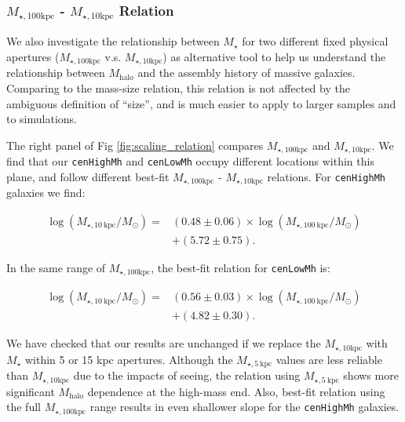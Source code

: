 \documentclass[a4paper,fleqn,usenatbib]{mnras}
\def\rbcg{\texttt{cenHighMh}}
\def\nbcg{\texttt{cenLowMh}}
\def\mstar{{$M_{\star}$}}
\def\mhalo{{$M_{\mathrm{halo}}$}}
\def\minn{{$M_{\star,10\mathrm{kpc}}$}}
\def\mtot{{$M_{\star,100\mathrm{kpc}}$}}
\begin{document}
\subsubsection{\mtot{} - \minn{} Relation}
    \label{sssec:m100_m10}
    
    We also investigate the relationship between \mstar{} for two different
    fixed physical apertures (\mtot{} v.s. \minn{}) as alternative tool to help us 
    understand the relationship between \mhalo{} and the assembly history of massive
    galaxies.   
    Comparing to the mass-size relation, this relation is not affected by the 
    ambiguous definition of ``size'', and is much easier to apply to larger samples 
    and to simulations. 
    
    The right panel of Fig \ref{fig:scaling_relation} compares \mtot{} and \minn{}. 
    We find that our \rbcg{} and \nbcg{} occupy different locations within this plane,
    and follow different best-fit \mtot{} - \minn{} relations. 
    For \rbcg{} galaxies we find:
    
    \begin{equation}
        \begin{aligned}
        \log (M_{\star, 10\ \mathrm{kpc}}/M_{\odot}) = & (0.48\pm0.06) \times \log (M_{\star, 100\ \mathrm{kpc}}/M_{\odot}) \\ & +(5.72\pm0.75).
        \end{aligned}
    \end{equation}
    
    \noindent In the same range of \mtot{}, the best-fit relation for \nbcg{} is:
     
    \begin{equation}
        \begin{aligned}
        \log (M_{\star, 10\ \mathrm{kpc}}/M_{\odot}) = & (0.56\pm0.03) \times \log (M_{\star, 100\ \mathrm{kpc}}/M_{\odot}) \\ & +(4.82\pm0.30).
        \end{aligned}
    \end{equation}
    
    We have checked that our results are unchanged if we replace the \minn{} with 
    \mstar{} within 5 or 15 kpc apertures. 
    Although the $M_{\star, 5\ \mathrm{kpc}}$ values are less reliable than \minn{} 
    due to the impacts of seeing, the relation using $M_{\star, 5\ \mathrm{kpc}}$ shows 
    more significant \mhalo{} dependence at the high-mass end.
    Also, best-fit relation using the full \mtot{} range results in even shallower 
    slope for the \rbcg{} galaxies.
     
\end{document}
